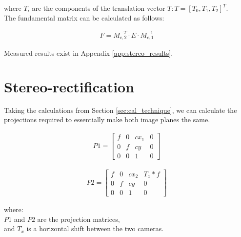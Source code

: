 where $T_i$ are the components of the translation vector $T : T=[T_0, T_1, T_2]^T$.\\

The fundamental matrix can be calculated as follows:

\begin{align*}
F = M_{c,2}^{-T}\cdot E\cdot M_{c,1}^{-1} 
\end{align*}

Measured results exist in Appendix \ref{app:stereo_results}.

\section{Stereo-rectification}

Taking the calculations from Section \ref{sec:cal_technique}, we can calculate the projections required to essentially make  both image planes the same.

\begin{align*}
P1 = \begin{bmatrix} f & 0 & cx_1 & 0 \\ 0 & f & cy & 0 \\ 0 & 0 & 1 & 0 \end{bmatrix}
\end{align*}

\begin{align*}
P2 = \begin{bmatrix} f & 0 & cx_2 & T_x*f \\ 0 & f & cy & 0 \\ 0 & 0 & 1 & 0 \end{bmatrix}
\end{align*}

where:\\
$P1$ and $P2$ are the projection matrices,\\
and $T_x$ is a horizontal shift between the two cameras.\\


